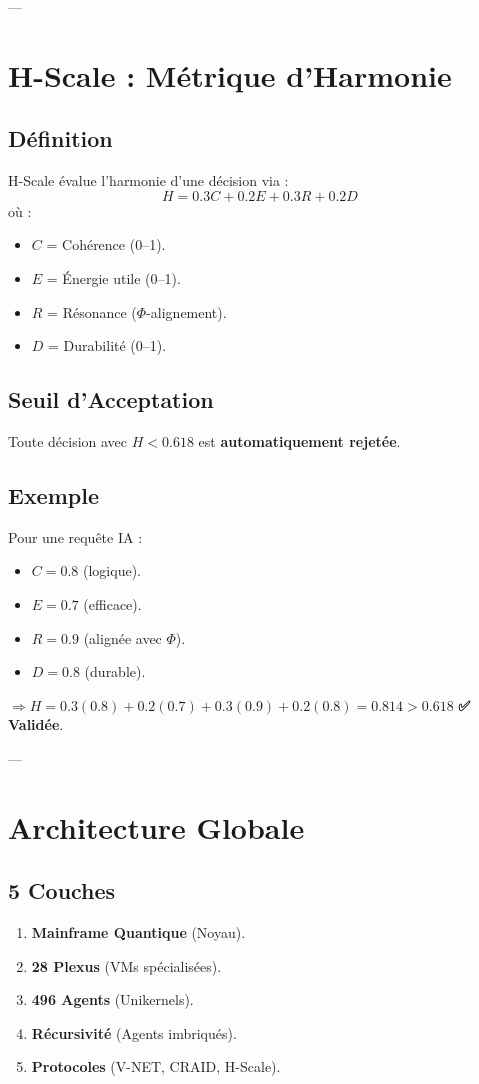 \documentclass{article}
\begin{document}
---

\section{H-Scale : Métrique d’Harmonie}
\subsection{Définition}
H-Scale évalue l’harmonie d’une décision via :
\begin{equation}
    H = 0.3C + 0.2E + 0.3R + 0.2D
\end{equation}
où :
\begin{itemize}
    \item $C$ = Cohérence (0–1).
    \item $E$ = Énergie utile (0–1).
    \item $R$ = Résonance ($\Phi$-alignement).
    \item $D$ = Durabilité (0–1).
\end{itemize}

\subsection{Seuil d’Acceptation}
Toute décision avec $H < 0.618$ est \textbf{automatiquement rejetée}.

\subsection{Exemple}
Pour une requête IA :
\begin{itemize}
    \item $C = 0.8$ (logique).
    \item $E = 0.7$ (efficace).
    \item $R = 0.9$ (alignée avec $\Phi$).
    \item $D = 0.8$ (durable).
\end{itemize}
$\Rightarrow H = 0.3(0.8) + 0.2(0.7) + 0.3(0.9) + 0.2(0.8) = 0.814 > 0.618$ \textbf{✅ Validée}.

---

\section{Architecture Globale}
\subsection{5 Couches}
\begin{enumerate}
    \item \textbf{Mainframe Quantique} (Noyau).
    \item \textbf{28 Plexus} (VMs spécialisées).
    \item \textbf{496 Agents} (Unikernels).
    \item \textbf{Récursivité} (Agents imbriqués).
    \item \textbf{Protocoles} (V-NET, CRAID, H-Scale).
\end{enumerate}
\end{document}
